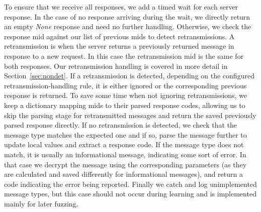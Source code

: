 To ensure that we receive all responses, we add a timed wait for each server response. In the case of no response arriving during the wait, we directly return an empty \textit{None} response and need no further handling. Otherwise, we check the response \ac{mid} against our list of previous \acp{mid} to detect retransmissions. A retransmission is when the server returns a previously returned message in response to a new request. In this case the retransmission \ac{mid} is the same for both responses. Our retransmission handling is covered in more detail in Section~\ref{sec:nondet}. If a retransmission is detected, depending on the configured retransmission-handling rule, it is either ignored or the corresponding previous response is returned. To save some time when not ignoring retransmissions, we keep a dictionary mapping \acp{mid} to their parsed response codes, allowing us to skip the parsing stage for retransmitted messages and return the saved previously parsed response directly. If no retransmission is detected, we check that the message type matches the expected one and if so, parse the message further to update local values and extract a response code. If the message type does not match, it is usually an informational message, indicating some sort of error. In that case we decrypt the message using the corresponding parameters (as they are calculated and saved differently for informational messages), and return a code indicating the error being reported. Finally we catch and log unimplemented message types, but this case should not occur during learning and is implemented mainly for later fuzzing.

